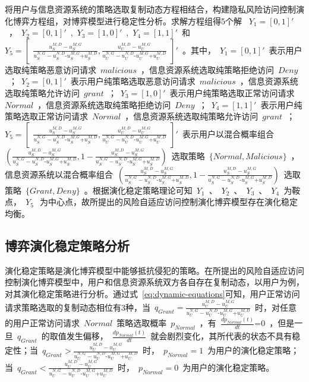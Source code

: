 将用户与信息资源系统的策略选取复制动态方程相结合，构建隐私风险访问控制演化博弈方程组，对博弈模型进行稳定性分析。求解方程组得5个解 ~${{Y}_{1}}=[0,1]'$~，~${{Y}_{2}}=\left[ 0 ,1 \right]'$~,~${{Y}_{3}}=\left[1 ,0 \right]'$~,~${{Y}_{4}}=\left[ 1 ,1 \right]'$~和~${{Y}_{5}}=
\begin{bmatrix}
\frac{u_{S}^{M,D}-u_{S}^{M,G}}{u_{S}^{N,G}-u_{S}^{N,D}\text{-}u_{S}^{M,G}\text{+}u_{S}^{M,D}},
\frac{u_{U}^{M,D}-u_{U}^{M,G}}{u_{U}^{N,G}-u_{U}^{N,D}\text{-}u_{U}^{M,G}\text{+}u_{U}^{M,D}}
\end{bmatrix}'$~。其中，~${{Y}_{1}}=[0,1]'$~表示用户选取纯策略恶意访问请求~$malicious$~，信息资源系统选取纯策略拒绝访问~$Deny$~；~${{Y}_{2}}=\left[ 0 ,1 \right]'$~表示用户纯策略选取恶意访问请求~$malicious$~，信息资源系统选取纯策略允许访问~$grant$~；~${{Y}_{3}}=\left[1 ,0 \right]'$~表示用户纯策略选取正常访问请求~$Normal$~，信息资源系统选取纯策略拒绝访问~$Deny$~；~${{Y}_{4}}=\left[ 1 ,1 \right]'$~表示用户纯策略选取正常访问请求~$Normal$~，信息资源系统选取纯策略允许访问~$grant$~；~${{Y}_{5}}=
\begin{bmatrix}
\frac{u_{S}^{M,D}-u_{S}^{M,G}}{u_{S}^{N,G}-u_{S}^{N,D}\text{-}u_{S}^{M,G}\text{+}u_{S}^{M,D}},
\frac{u_{U}^{M,D}-u_{U}^{M,G}}{u_{U}^{N,G}-u_{U}^{N,D}\text{-}u_{U}^{M,G}\text{+}u_{U}^{M,D}}
\end{bmatrix}'$~表示用户以混合概率组合~$( \frac{u_{S}^{M,D}-u_{S}^{M,G}}{u_{S}^{N,G}-u_{S}^{N,D}\text{-}u_{S}^{M,G}\text{+}u_{S}^{M,D}}, 1- \frac{u_{S}^{M,D}-u_{S}^{M,G}}{u_{S}^{N,G}-u_{S}^{N,D}\text{-}u_{S}^{M,G}\text{+}u_{S}^{M,D}})$~选取策略~$\{Normal, Malicious\}$~，信息资源系统以混合概率组合~$(\frac{u_{S}^{M,D}-u_{S}^{M,G}}{u_{S}^{N,G}-u_{S}^{N,D}\text{-}u_{S}^{M,G}\text{+}u_{S}^{M,D}} , 1-\frac{u_{S}^{M,D}-u_{S}^{M,G}}{u_{S}^{N,G}-u_{S}^{N,D}\text{-}u_{S}^{M,G}\text{+}u_{S}^{M,D}} )$~选取策略~$\{Grant, Deny\}$~。根据演化稳定策略理论可知~$Y_1$~、~$Y_2$~、~$Y_3$~、~$Y_4$~为鞍点，~$Y_5~$~为中心点，故所提出的风险自适应访问控制演化博弈模型存在演化稳定均衡。

\subsection{博弈演化稳定策略分析}
演化稳定策略是演化博弈模型中能够抵抗侵犯的策略。在所提出的风险自适应访问控制演化博弈模型中，用户和信息资源系统双方各自存在复制动态，以用户为例，对其演化稳定策略进行分析。通过式~\ref{eq:dynamic-equations}可知，用户正常访问请求策略选取的复制动态相位有3种，当~${{q}_{Grant}}=\frac{u_{U}^{M,D}-u_{U}^{M,G}}{u_{U}^{N,G}-u_{U}^{N,D}\text{-}u_{U}^{M,G}\text{+}u_{U}^{M,D}}$~时，对任意的用户正常访问请求~$Normal$~策略选取概率~$p_{Normal}$~，有~$\frac{d{{p}_{Normal}}(t)}{dt}\text{=0}$~，但是一旦~$q_{Grant}$~的取值发生偏移，~$\frac{d{{p}_{Normal}}(t)}{dt}$~就会剧烈变化，其所代表的状态不具有稳定性；当~${{q}_{Grant}}>\frac{u_{U}^{M,D}-u_{U}^{M,G}}{u_{U}^{N,G}-u_{U}^{N,D}\text{-}u_{U}^{M,G}\text{+}u_{U}^{M,D}}$~时，~$p_{Normal}= 1$~为用户的演化稳定策略；当~${{q}_{Grant}}<\frac{u_{U}^{M,D}-u_{U}^{M,G}}{u_{U}^{N,G}-u_{U}^{N,D}\text{-}u_{U}^{M,G}\text{+}u_{U}^{M,D}}$~时，~$p_{Normal}=0$~为用户的演化稳定策略。

